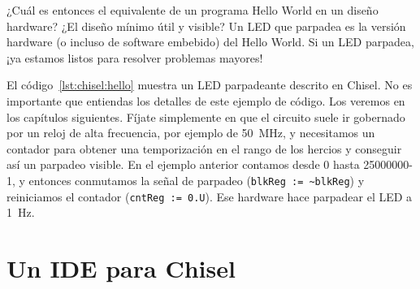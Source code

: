 \documentclass[%
    10pt,
    headinclude, footinclude=false,
    openright, %
    notitlepage,
    cleardoublepage=empty,
    headsepline,
    numbers=noenddot,
    bibliography=totoc, index=totoc,
    ]{scrbook}
\newcommand{\code}[1]{{\lstinline[basicstyle=\small\ttfamily]{#1}}}
\begin{document}
¿Cuál es entonces el equivalente de un programa Hello World en un diseño hardware?
¿El diseño mínimo útil y visible? Un LED que parpadea es la versión hardware (o incluso
de software embebido) del Hello World. Si un LED parpadea, ¡ya estamos listos para
resolver problemas mayores!




El código~\ref{lst:chisel:hello} muestra un LED parpadeante descrito en Chisel.
No es importante que entiendas los detalles de este ejemplo de código.
Los veremos en los capítulos siguientes. Fíjate simplemente en que el circuito
suele ir gobernado por un reloj de alta frecuencia, por ejemplo de 50~MHz, y necesitamos un contador
para obtener una temporización en el rango de los hercios y conseguir así un parpadeo visible. En el
ejemplo anterior contamos desde 0 hasta 25000000-1, y entonces conmutamos la señal de parpadeo
(\code{blkReg := ~blkReg}) y reiniciamos el contador (\code{cntReg := 0.U}).
Ese hardware hace parpadear el LED a 1~Hz.

\section{Un IDE para Chisel}

\end{document}
